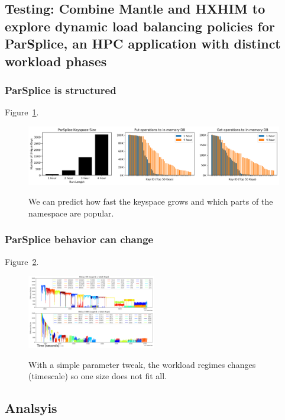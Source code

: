 \subsection{Testing: Combine Mantle and HXHIM to explore dynamic load balancing
policies for ParSplice, an HPC application with distinct workload phases}

\subsubsection{ParSplice is structured}
Figure~\ref{fig:scale-length}.
\begin{figure}[tbh]
  \noindent\includegraphics[width=1\textwidth]{figures/scale-length.png}\\
  \caption{We can predict how fast the keyspace grows and which parts of the
  namespace are popular.\label{fig:scale-length}}
\end{figure}


\subsubsection{ParSplice behavior can change}

Figure~\ref{fig:scale-delay}.
\begin{figure}[tbh]
  \noindent\includegraphics[width=0.5\textwidth]{figures/scale-delay.png}\\
  \caption{With a simple parameter tweak, the workload regimes changes
  (timescale) so one size does not fit all.  \label{fig:scale-delay}}
\end{figure}



\subsection{Analsyis}

\pagebreak
